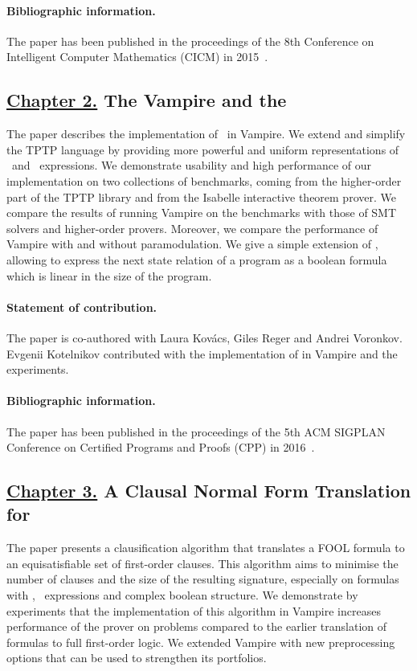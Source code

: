 \paragraph{Bibliographic information.} The paper has been published in the proceedings of the 8th Conference on Intelligent Computer Mathematics (CICM) in 2015~\cite{FOOL}.

\subsection*{\hyperref[chap:implementation]{Chapter 2.} The Vampire and the \folb{}}
The paper describes the implementation of \folb\ in Vampire. We extend and simplify the TPTP language by providing more powerful and uniform representations of \ITE\ and \LETIN\ expressions. We demonstrate usability and high performance of our implementation on two collections of benchmarks, coming from the higher-order part of the TPTP library and from the Isabelle interactive theorem prover. We compare the results of running Vampire on the benchmarks with those of SMT solvers and higher-order provers. Moreover, we compare the performance of Vampire with and without \folb{} paramodulation. We give a simple extension of \folb, allowing to express the next state relation of a program as a boolean formula which is linear in the size of the program.

\paragraph{Statement of contribution.} The paper is co-authored with Laura Kov\'{a}cs, Giles Reger and Andrei Voronkov. Evgenii Kotelnikov contributed with the implementation of \folb{} in Vampire and the experiments.

\paragraph{Bibliographic information.} The paper has been published in the proceedings of the 5th ACM SIGPLAN Conference on Certified Programs and Proofs (CPP) in 2016~\cite{VampireAndFOOL}.

\subsection*{\hyperref[chap:cnf]{Chapter 3.} A Clausal Normal Form Translation\\for \folb{}}
The paper presents a clausification algorithm that translates a FOOL formula to an equisatisfiable set of first-order clauses. This algorithm aims to minimise the number of clauses and the size of the resulting signature, especially on formulas with \ITE, \LETIN\ expressions and complex boolean structure. We demonstrate by experiments that the implementation of this algorithm in Vampire increases performance of the prover on \folb{} problems compared to the earlier translation of \folb{} formulas to full first-order logic. We extended Vampire with new preprocessing options that can be used to strengthen its portfolios.

